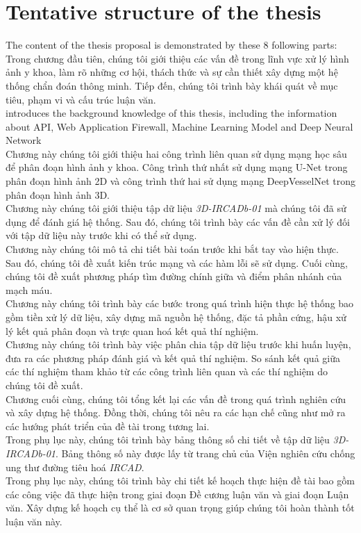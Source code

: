 \section{Tentative structure of the thesis}
\label{sec:structure}
	\newcommand\nextintro{\\[7mm]}
	The content of the thesis proposal is demonstrated by these 8 following parts: \nextintro
	 Trong chương đầu tiên, chúng tôi giới thiệu các vấn đề trong lĩnh vực xử lý hình ảnh y khoa, làm rõ những cơ hội, thách thức và sự cần thiết xây dựng một hệ thống chẩn đoán thông minh. Tiếp đến, chúng tôi trình bày khái quát về mục tiêu, phạm vi và cấu trúc luận văn.\nextintro
	 introduces the background knowledge of this thesis, including the information about API, Web Application Firewall, Machine Learning Model and Deep Neural Network\nextintro
	 Chương này chúng tôi giới thiệu hai công trình liên quan sử dụng mạng học sâu để phân đoạn hình ảnh y khoa. Công trình thứ nhất sử dụng mạng U-Net trong phân đoạn hình ảnh 2D và công trình thứ hai sử dụng mạng DeepVesselNet trong phân đoạn hình ảnh 3D.\nextintro
	 Chương này chúng tôi giới thiệu tập dữ liệu \textit{3D-IRCADb-01} mà chúng tôi đã sử dụng để đánh giá hệ thống. Sau đó, chúng tôi trình bày các vấn đề cần xử lý đối với tập dữ liệu này trước khi có thể sử dụng.\nextintro
	 Chương này chúng tôi mô tả chi tiết bài toán trước khi bắt tay vào hiện thực. Sau đó, chúng tôi đề xuất kiến trúc mạng và các hàm lỗi sẽ sử dụng. Cuối cùng, chúng tôi đề xuất phương pháp tìm đường chính giữa và điểm phân nhánh của mạch máu.\nextintro
	 Chương này chúng tôi trình bày các bước trong quá trình hiện thực hệ thống bao gồm tiền xử lý dữ liệu, xây dựng mã nguồn hệ thống, đặc tả phần cứng, hậu xử lý kết quả phân đoạn và trực quan hoá kết quả thí nghiệm.\nextintro
	 Chương này chúng tôi trình bày việc phân chia tập dữ liệu trước khi huấn luyện, đưa ra các phương pháp đánh giá và kết quả thí nghiệm. So sánh kết quả giữa các thí nghiệm tham khảo từ các công trình liên quan và các thí nghiệm do chúng tôi đề xuất.\nextintro
	 Chương cuối cùng, chúng tôi tổng kết lại các vấn đề trong quá trình nghiên cứu và xây dựng hệ thống. Đồng thời, chúng tôi nêu ra các hạn chế cũng như mở ra các hướng phát triển của đề tài trong tương lai.\nextintro
	 Trong phụ lục này, chúng tôi trình bày bảng thông số chi tiết về tập dữ liệu \textit{3D-IRCADb-01}. Bảng thông số này được lấy từ trang chủ của Viện nghiên cứu chống ung thư đường tiêu hoá \textit{IRCAD}. \nextintro
	 Trong phụ lục này, chúng tôi trình bày chi tiết kế hoạch thực hiện đề tài bao gồm các công việc đã thực hiện trong giai đoạn Đề cương luận văn và giai đoạn Luận văn. Xây dựng kế hoạch cụ thể là cơ sở quan trọng giúp chúng tôi hoàn thành tốt luận văn này.